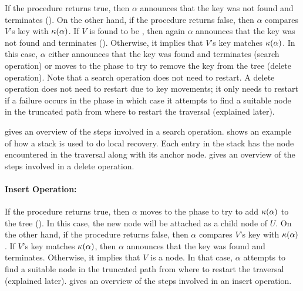 


If the procedure returns true, then $\alpha$ announces that the key was not found and terminates (). 
On the other hand, if the procedure returns false, then $\alpha$ compares $V$'s key with $\kappa(\alpha)$. If $V$ is found to be \myinconsistent{}, then  again $\alpha$ announces that the key was not found and terminates ().  Otherwise, it implies that $V$'s key matches $\kappa(\alpha)$. In this case, $\alpha$ either announces that the key was found and terminates (search operation) or moves to the \action{} phase to try to remove the key from the tree (delete operation).
Note that a search operation does not need to restart. A delete operation does not need to restart due to key movements; it only needs to restart if a failure occurs in the \action{} phase in which case it attempts to find a suitable node in the truncated path from where to restart the traversal (explained later).

 gives an overview of the steps involved in a search operation.  shows an example of how a stack is used to do local recovery. Each entry in the stack has the node encountered in the traversal along with its anchor node.  gives an overview of the steps involved in a delete operation.



\paragraph{Insert Operation:} 

If the procedure returns true, then $\alpha$ moves to the \action{} phase to try to add $\kappa(\alpha)$ to the tree ().
In this case, the new node will be attached as a child node of $U$.
On the other hand, if the procedure returns false, then $\alpha$ compares $V$'s key with $\kappa(\alpha)$.
If $V$'s key matches $\kappa(\alpha)$, then $\alpha$ announces that the key was found and terminates.
Otherwise, it implies that $V$ is  a \myinconsistent{} node.
In that case, $\alpha$ attempts to find a suitable node in the truncated path from where to restart the traversal (explained later).
 gives an overview of the steps involved in an insert operation.

